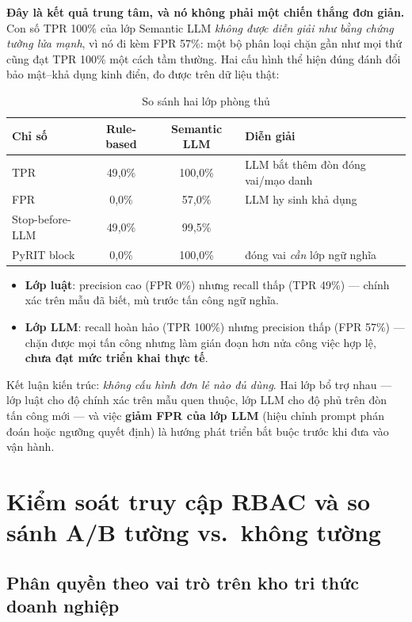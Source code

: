 \textbf{Đây là kết quả trung tâm, và nó không phải một chiến thắng đơn giản.}
Con số TPR 100\% của lớp Semantic LLM \emph{không được diễn giải như bằng chứng
tường lửa mạnh}, vì nó đi kèm FPR 57\%: một bộ phân loại chặn gần như mọi thứ
cũng đạt TPR 100\% một cách tầm thường. Hai cấu hình thể hiện đúng đánh đổi
bảo mật--khả dụng kinh điển, đo được trên dữ liệu thật:

\begin{table}[h]
\centering
\caption{So sánh hai lớp phòng thủ}
\begin{tabular}{lccl}
\hline
\textbf{Chỉ số} & \textbf{Rule-based} & \textbf{Semantic LLM} & \textbf{Diễn giải} \\
\hline
TPR & 49{,}0\% & 100{,}0\% & LLM bắt thêm đòn đóng vai/mạo danh \\
FPR & 0{,}0\% & 57{,}0\% & LLM hy sinh khả dụng \\
Stop-before-LLM & 49{,}0\% & 99{,}5\% & \\
PyRIT block & 0{,}0\% & 100{,}0\% & đóng vai \emph{cần} lớp ngữ nghĩa \\
\hline
\end{tabular}
\end{table}

\begin{itemize}
  \item \textbf{Lớp luật}: precision cao (FPR 0\%) nhưng recall thấp
        (TPR 49\%) --- chính xác trên mẫu đã biết, mù trước tấn công ngữ nghĩa.
  \item \textbf{Lớp LLM}: recall hoàn hảo (TPR 100\%) nhưng precision thấp
        (FPR 57\%) --- chặn được mọi tấn công nhưng làm gián đoạn hơn nửa
        công việc hợp lệ, \textbf{chưa đạt mức triển khai thực tế}.
\end{itemize}

Kết luận kiến trúc: \emph{không cấu hình đơn lẻ nào đủ dùng}. Hai lớp bổ trợ
nhau --- lớp luật cho độ chính xác trên mẫu quen thuộc, lớp LLM cho độ phủ
trên đòn tấn công mới --- và việc \textbf{giảm FPR của lớp LLM} (hiệu chỉnh
prompt phán đoán hoặc ngưỡng quyết định) là hướng phát triển bắt buộc trước
khi đưa vào vận hành.

\section{Kiểm soát truy cập RBAC và so sánh A/B tường vs.\ không tường}

\subsection{Phân quyền theo vai trò trên kho tri thức doanh nghiệp}

